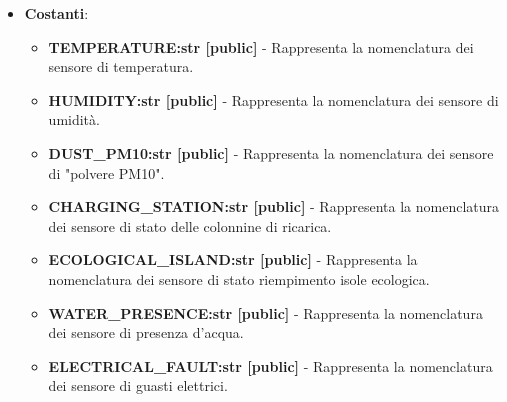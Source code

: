 \begin{itemize}
\begin{itemize}
            \item \textbf{Costanti}: 
            \begin{itemize}
                \item \textbf{TEMPERATURE:str [public]} - Rappresenta la nomenclatura dei sensore di temperatura.
                \item \textbf{HUMIDITY:str [public]} - Rappresenta la nomenclatura dei sensore di umidità.
                \item \textbf{DUST\_PM10:str [public]} - Rappresenta la nomenclatura dei sensore di "polvere PM10".
                \item \textbf{CHARGING\_STATION:str [public]} - Rappresenta la nomenclatura dei sensore di stato delle colonnine di ricarica.
                \item \textbf{ECOLOGICAL\_ISLAND:str [public]} - Rappresenta la nomenclatura dei sensore di stato riempimento isole ecologica.
                \item \textbf{WATER\_PRESENCE:str [public]} - Rappresenta la nomenclatura dei sensore di presenza d'acqua.
                \item \textbf{ELECTRICAL\_FAULT:str [public]} - Rappresenta la nomenclatura dei sensore di guasti elettrici.
            \end{itemize}


\end{itemize}
\end{itemize}
